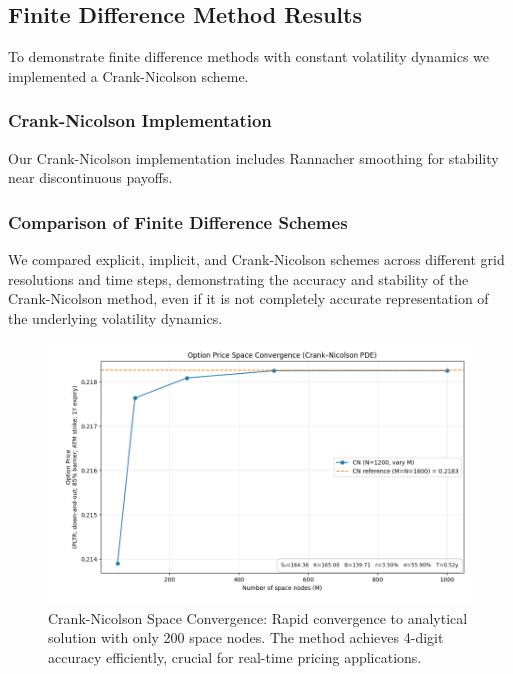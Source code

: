 \documentclass[11pt,a4paper]{article}
\begin{document}
\subsection{Finite Difference Method Results}

To demonstrate finite difference methods with constant volatility dynamics we implemented a Crank-Nicolson scheme.

\subsubsection{Crank-Nicolson Implementation}

Our Crank-Nicolson implementation includes Rannacher smoothing for stability near discontinuous payoffs.

\subsubsection{Comparison of Finite Difference Schemes}

We compared explicit, implicit, and Crank-Nicolson schemes across different grid resolutions and time steps, demonstrating the accuracy and stability of the Crank-Nicolson method, even if it is not completely accurate representation of the underlying volatility dynamics.

\begin{figure}[H]
\centering
\includegraphics[width=\textwidth]{../charts/Constant Vol Charts/crank_nicholson.png}
\caption{Crank-Nicolson Space Convergence: Rapid convergence to analytical solution with only 200 space nodes. The method achieves 4-digit accuracy efficiently, crucial for real-time pricing applications.}
\label{fig:cn_results}
\end{figure}
\end{document}
